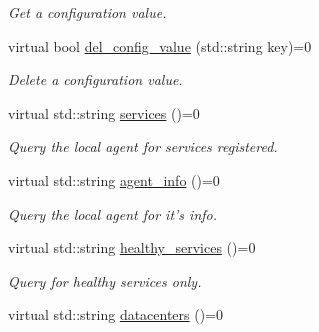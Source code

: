 \begin{DoxyCompactItemize}
\begin{DoxyCompactList}\small\item\em Get a configuration value. \end{DoxyCompactList}\item 
\hypertarget{classConsulInterface_a3a6e57ac45cf284e92def6136b0e23d9}{virtual bool \hyperlink{classConsulInterface_a3a6e57ac45cf284e92def6136b0e23d9}{del\-\_\-config\-\_\-value} (std\-::string key)=0}\label{classConsulInterface_a3a6e57ac45cf284e92def6136b0e23d9}

\begin{DoxyCompactList}\small\item\em Delete a configuration value. \end{DoxyCompactList}\item 
\hypertarget{classConsulInterface_ad130a602282f9854a2eae856bb60a745}{virtual std\-::string \hyperlink{classConsulInterface_ad130a602282f9854a2eae856bb60a745}{services} ()=0}\label{classConsulInterface_ad130a602282f9854a2eae856bb60a745}

\begin{DoxyCompactList}\small\item\em Query the local agent for services registered. \end{DoxyCompactList}\item 
\hypertarget{classConsulInterface_a6fb0bda867b267614b44328fd044859e}{virtual std\-::string \hyperlink{classConsulInterface_a6fb0bda867b267614b44328fd044859e}{agent\-\_\-info} ()=0}\label{classConsulInterface_a6fb0bda867b267614b44328fd044859e}

\begin{DoxyCompactList}\small\item\em Query the local agent for it's info. \end{DoxyCompactList}\item 
\hypertarget{classConsulInterface_a229eaac89811b9e1f5f3c9ec70ea68aa}{virtual std\-::string \hyperlink{classConsulInterface_a229eaac89811b9e1f5f3c9ec70ea68aa}{healthy\-\_\-services} ()=0}\label{classConsulInterface_a229eaac89811b9e1f5f3c9ec70ea68aa}

\begin{DoxyCompactList}\small\item\em Query for healthy services only. \end{DoxyCompactList}\item 
\hypertarget{classConsulInterface_a16848fcc856afae488c55e4f4febf268}{virtual std\-::string \hyperlink{classConsulInterface_a16848fcc856afae488c55e4f4febf268}{datacenters} ()=0}\label{classConsulInterface_a16848fcc856afae488c55e4f4febf268}


\end{DoxyCompactItemize}
